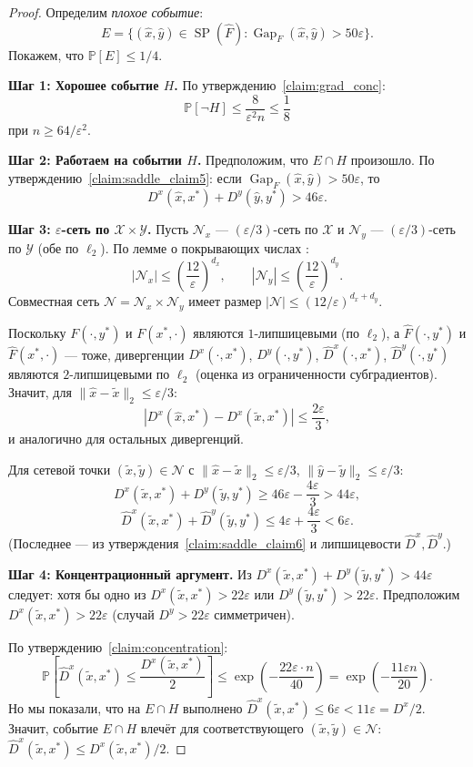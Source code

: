 \documentclass[12pt,a4paper]{article}
\theoremstyle{plain}
\theoremstyle{definition}
\DeclareMathOperator{\Gap}{Gap}
\DeclareMathOperator{\SP}{SP}
\renewcommand{\Pr}{\mathbb{P}}
\newcommand{\cX}{\mathcal{X}}
\newcommand{\cY}{\mathcal{Y}}
\newcommand{\cN}{\mathcal{N}}
\newcommand{\hatF}{\hat{F}}
\newcommand{\hatD}{\hat{D}}
\begin{document}
\begin{proof}
Определим \emph{плохое событие}:
\[
    E=\bigl\{(\hat{x},\hat{y})\in\SP(\hatF):\Gap_F(\hat{x},\hat{y})>50\varepsilon\bigr\}.
\]
Покажем, что $\Pr[E]\le 1/4$.

\textbf{Шаг 1: Хорошее событие $H$.}
По утверждению~\ref{claim:grad_conc}:
\[
    \Pr[\neg H]\le\frac{8}{\varepsilon^2 n}\le\frac{1}{8}
\]
при $n\ge 64/\varepsilon^2$.

\textbf{Шаг 2: Работаем на событии $H$.}
Предположим, что $E\cap H$ произошло. По утверждению~\ref{claim:saddle_claim5}: если $\Gap_F(\hat{x},\hat{y})>50\varepsilon$, то
\[
    D^x(\hat{x},x^*)+D^y(\hat{y},y^*)>46\varepsilon.
\]

\textbf{Шаг 3: $\varepsilon$-сеть по $\cX\times\cY$.}
Пусть $\cN_x$ --- $(\varepsilon/3)$-сеть по $\cX$ и $\cN_y$ --- $(\varepsilon/3)$-сеть по $\cY$ (обе по $\ell_2$). По лемме о покрывающих числах \cite{CLY2023}:
\[
    |\cN_x|\le\left(\frac{12}{\varepsilon}\right)^{d_x},\qquad
    |\cN_y|\le\left(\frac{12}{\varepsilon}\right)^{d_y}.
\]
Совместная сеть $\cN=\cN_x\times\cN_y$ имеет размер $|\cN|\le(12/\varepsilon)^{d_x+d_y}$.

Поскольку $F(\cdot,y^*)$ и $F(x^*,\cdot)$ являются $1$-липшицевыми (по $\ell_2$), а $\hatF(\cdot,y^*)$ и $\hatF(x^*,\cdot)$ --- тоже, дивергенции $D^x(\cdot,x^*)$, $D^y(\cdot,y^*)$, $\hatD^x(\cdot,x^*)$, $\hatD^y(\cdot,y^*)$ являются $2$-липшицевыми по $\ell_2$ (оценка из ограниченности субградиентов). Значит, для $\|\hat{x}-\tilde{x}\|_2\le\varepsilon/3$:
\[
    |D^x(\hat{x},x^*)-D^x(\tilde{x},x^*)|\le\frac{2\varepsilon}{3},
\]
и аналогично для остальных дивергенций.

Для сетевой точки $(\tilde{x},\tilde{y})\in\cN$ с $\|\hat{x}-\tilde{x}\|_2\le\varepsilon/3$, $\|\hat{y}-\tilde{y}\|_2\le\varepsilon/3$:
\[
    D^x(\tilde{x},x^*)+D^y(\tilde{y},y^*)\ge 46\varepsilon-\frac{4\varepsilon}{3}>44\varepsilon,
\]
\[
    \hatD^x(\tilde{x},x^*)+\hatD^y(\tilde{y},y^*)\le 4\varepsilon+\frac{4\varepsilon}{3}<6\varepsilon.
\]
(Последнее --- из утверждения~\ref{claim:saddle_claim6} и липшицевости $\hatD^x,\hatD^y$.)

\textbf{Шаг 4: Концентрационный аргумент.}
Из $D^x(\tilde{x},x^*)+D^y(\tilde{y},y^*)>44\varepsilon$ следует: хотя бы одно из $D^x(\tilde{x},x^*)>22\varepsilon$ или $D^y(\tilde{y},y^*)>22\varepsilon$. Предположим $D^x(\tilde{x},x^*)>22\varepsilon$ (случай $D^y>22\varepsilon$ симметричен).

По утверждению~\ref{claim:concentration}:
\[
    \Pr\!\left[\hatD^x(\tilde{x},x^*)\le\frac{D^x(\tilde{x},x^*)}{2}\right]\le\exp\!\left(-\frac{22\varepsilon\cdot n}{40}\right)=\exp\!\left(-\frac{11\varepsilon n}{20}\right).
\]
Но мы показали, что на $E\cap H$ выполнено $\hatD^x(\tilde{x},x^*)\le 6\varepsilon<11\varepsilon=D^x/2$. Значит, событие $E\cap H$ влечёт для соответствующего $(\tilde{x},\tilde{y})\in\cN$: $\hatD^x(\tilde{x},x^*)\le D^x(\tilde{x},x^*)/2$.


\end{proof}
\end{document}
